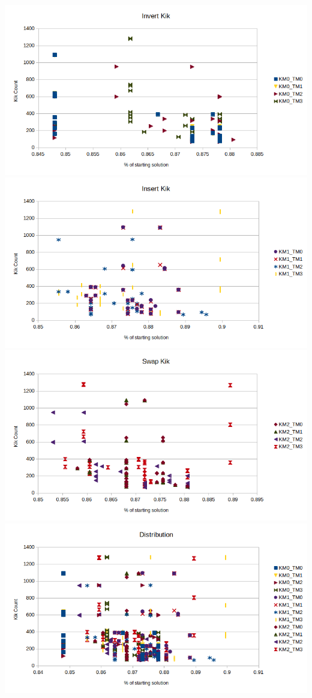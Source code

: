 \documentclass{article}
\begin{document}
\includegraphics[scale=0.36]{InvertDist}
\includegraphics[scale=0.36]{InsertDist}
\includegraphics[scale=0.36]{SwapDist}
\includegraphics[scale=0.36]{OverallDist}
\end{document}
